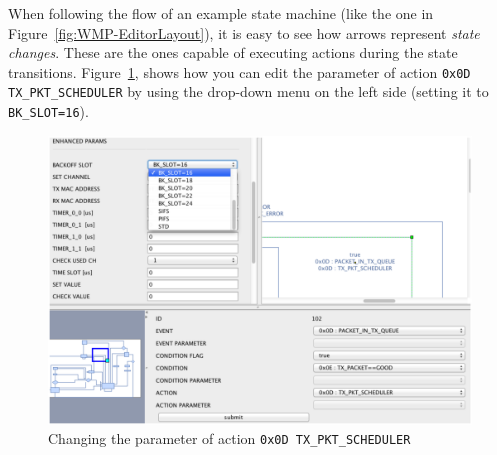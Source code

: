 When following the flow of an example state machine (like the one in Figure~\ref{fig:WMP-EditorLayout}), it is easy to see how arrows represent \emph{state changes}. These are the ones capable of executing actions during the state transitions. Figure~\ref{fig:WMP-EditorSetting}, shows how you can edit the parameter of action \texttt{0x0D TX\_PKT\_SCHEDULER} by using the drop-down menu on the left side (setting it to \texttt{BK\_SLOT=16}).

\begin{figure}[htbp]
  \centering
  \includegraphics[width=0.95\linewidth]{figures/WMP-EditorSetting.eps}
  \caption{Changing the parameter of action \texttt{0x0D TX\_PKT\_SCHEDULER}
  \label{fig:WMP-EditorSetting}}
\end{figure}
